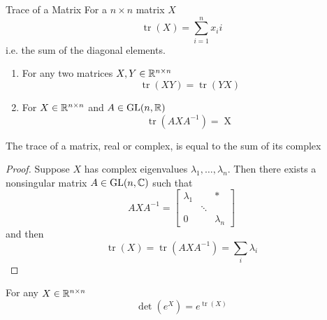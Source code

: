 \begin{definition}{Trace of a Matrix}{}
    For a \(n \times n\) matrix \(X\)
    \[
        \operatorname{tr}(X) = \sum_{i=1}^n x_ii    
    \]
    i.e. the sum of the diagonal elements.
\end{definition}
\begin{lemma}{}{}
    \begin{enumerate}
        \item For any two matrices \(X,Y \in \mathbb{R}^{n \times n}\) \[
            \operatorname{tr}(XY) = \operatorname{tr}(YX)    
        \]
        \item For \(X \in \mathbb{R}^{n \times n}\) and \(A \in \operatorname{GL}(n, \mathbb{R})\) \[
            \operatorname{tr}(AXA^{-1}) = \operatorname{X}    
        \]
    \end{enumerate}
\end{lemma}
\begin{proposition}{}{}
    The trace of a matrix, real or complex, is equal to the sum of its complex  
\end{proposition}
\begin{proof}
    Suppose \(X\) has complex eigenvalues \(\lambda_1, \dots, \lambda_n\).
    Then there exists a nonsingular matrix \(A \in \operatorname{GL}(n, \mathbb{C})\) such that 
    \[
        AXA^{-1} = \begin{bmatrix}
            \lambda_1 & & * \\ 
            & \ddots & \\
            0 & & \lambda_n
        \end{bmatrix}
    \]
    and then 
    \[
        \operatorname{tr}(X) = \operatorname{tr} (AXA^{-1}) = \sum_i \lambda_i
    \]
\end{proof}
\begin{proposition}{}{}
    For any \(X \in \mathbb{R}^{n \times n}\) 
    \[
        \det (e^X) = e^{\operatorname{tr}(X)}   
    \]
\end{proposition}
